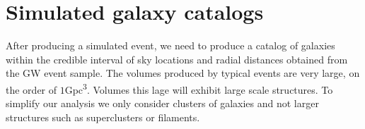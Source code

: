 





\section{\label{sec:clust_gen} Simulated galaxy catalogs}
After producing a simulated event, we need to produce a catalog of galaxies within the credible interval of sky locations and radial distances obtained from the GW event sample. The volumes produced by typical events are very large, on the order of $1$\si{Gpc^3}. Volumes this lage will exhibit large scale structures. To simplify our analysis we only consider clusters of galaxies and not larger structures such as superclusters or filaments.

